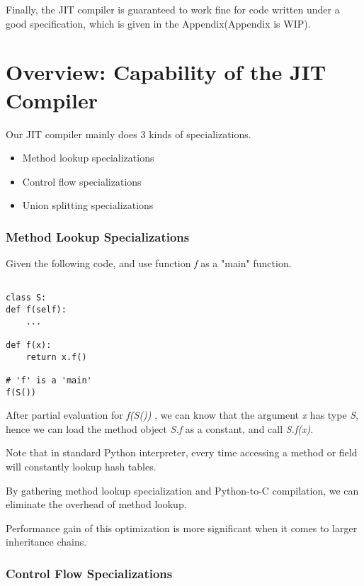 \documentclass[12pt, a4paper]{report}
\begin{document}
Finally, the JIT compiler is guaranteed to work fine for code written under a good specification, which is given in the Appendix(Appendix is WIP).

\section*{Overview: Capability of the JIT Compiler}

Our JIT compiler mainly does 3 kinds of specializations.

\begin{itemize}
    \item Method lookup specializations
    \item Control flow specializations
    \item Union splitting specializations
\end{itemize}

\subsubsection*{Method Lookup Specializations}

Given the following code, and use function \textit{f} as a "main" function.

\begin{lstlisting}

class S:
def f(self):
    ...

def f(x):
    return x.f()

# 'f' is a 'main'
f(S())

\end{lstlisting}


After partial evaluation for \textit{f(S())} , we can know that the argument \textit{x} has type \textit{S}, hence we can load the method object \textit{S.f} as a constant,
and call \textit{S.f(x)}.

Note that in standard Python interpreter, every time accessing a method or field will constantly lookup hash tables.

By gathering method lookup specialization and Python-to-C compilation, we can eliminate the overhead of method lookup.

Performance gain of this optimization is more significant when it comes to larger inheritance chains.

\subsubsection*{Control Flow Specializations}
\end{document}
